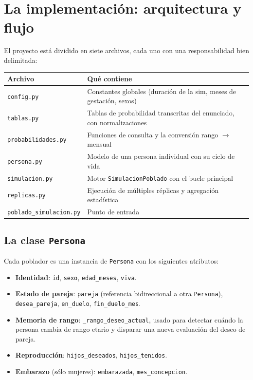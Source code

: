 \documentclass[12pt,a4paper]{article}
\begin{document}
\section{La implementación: arquitectura y flujo}

El proyecto está dividido en siete archivos, cada uno con una responsabilidad bien delimitada:

\begin{center}
\begin{tabular}{p{4.5cm}p{8.5cm}}
\toprule
\textbf{Archivo} & \textbf{Qué contiene} \\
\midrule
\texttt{config.py}              & Constantes globales (duración de la sim, meses de gestación, sexos) \\
\texttt{tablas.py}              & Tablas de probabilidad transcritas del enunciado, con normalizaciones \\
\texttt{probabilidades.py}      & Funciones de consulta y la conversión rango $\to$ mensual \\
\texttt{persona.py}             & Modelo de una persona individual con su ciclo de vida \\
\texttt{simulacion.py}          & Motor \texttt{SimulacionPoblado} con el bucle principal \\
\texttt{replicas.py}            & Ejecución de múltiples réplicas y agregación estadística \\
\texttt{poblado\_simulacion.py} & Punto de entrada \\
\bottomrule
\end{tabular}
\end{center}

\subsection{La clase \texttt{Persona}}

Cada poblador es una instancia de \texttt{Persona} con los siguientes atributos:

\begin{itemize}
    \item \textbf{Identidad}: \texttt{id}, \texttt{sexo}, \texttt{edad\_meses}, \texttt{viva}.
    \item \textbf{Estado de pareja}: \texttt{pareja} (referencia bidireccional a otra \texttt{Persona}), \texttt{desea\_pareja}, \texttt{en\_duelo}, \texttt{fin\_duelo\_mes}.
    \item \textbf{Memoria de rango}: \texttt{\_rango\_deseo\_actual}, usado para detectar cuándo la persona cambia de rango etario y disparar una nueva evaluación del deseo de pareja.
    \item \textbf{Reproducción}: \texttt{hijos\_deseados}, \texttt{hijos\_tenidos}.
    \item \textbf{Embarazo} (sólo mujeres): \texttt{embarazada}, \texttt{mes\_concepcion}.
\end{itemize}
\end{document}
